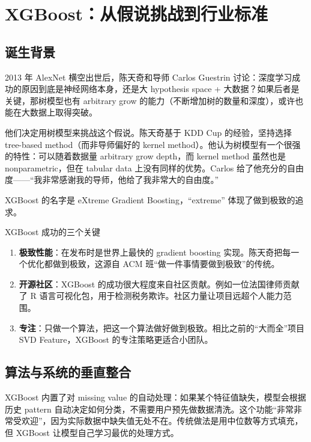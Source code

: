 \section{XGBoost：从假说挑战到行业标准}

\subsection{诞生背景}

2013 年 AlexNet 横空出世后，陈天奇和导师 Carlos Guestrin 讨论：深度学习成功的原因到底是神经网络本身，还是大 hypothesis space + 大数据？如果后者是关键，那树模型也有 arbitrary grow 的能力（不断增加树的数量和深度），或许也能在大数据上取得突破。

他们决定用树模型来挑战这个假说。陈天奇基于 KDD Cup 的经验，坚持选择 tree-based method（而非导师偏好的 kernel method）。他认为树模型有一个很强的特性：可以随着数据量 arbitrary grow depth，而 kernel method 虽然也是 nonparametric，但在 tabular data 上没有同样的优势。Carlos 给了他充分的自由度------``我非常感谢我的导师，他给了我非常大的自由度。''

XGBoost 的名字是 eXtreme Gradient Boosting，``extreme'' 体现了做到极致的追求。

\begin{importantbox}{XGBoost 成功的三个关键}
\begin{enumerate}
    \item \textbf{极致性能}：在发布时是世界上最快的 gradient boosting 实现。陈天奇把每一个优化都做到极致，这源自 ACM 班``做一件事情要做到极致''的传统。
    \item \textbf{开源社区}：XGBoost 的成功很大程度来自社区贡献。例如一位法国律师贡献了 R 语言可视化包，用于检测税务欺诈。社区力量让项目远超个人能力范围。
    \item \textbf{专注}：只做一个算法，把这一个算法做好做到极致。相比之前的``大而全''项目 SVD Feature，XGBoost 的专注策略更适合小团队。
\end{enumerate}
\end{importantbox}

\subsection{算法与系统的垂直整合}

XGBoost 内置了对 missing value 的自动处理：如果某个特征值缺失，模型会根据历史 pattern 自动决定如何分类，不需要用户预先做数据清洗。这个功能``非常非常受欢迎''，因为实际数据中缺失值无处不在。传统做法是用中位数等方式填充，但 XGBoost 让模型自己学习最优的处理方式。

